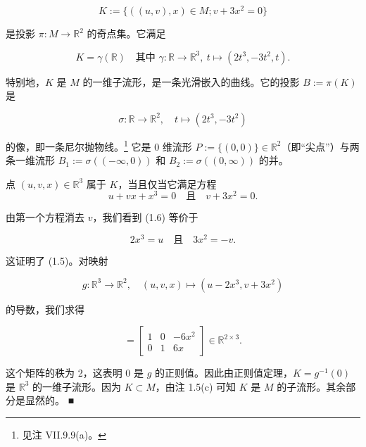 \begin{example}
\begin{items}
\[
K := \{((u, v), x) \in M ; v + 3x^2 = 0\}
\]

是投影 $ \pi: M \to \mathbb{R}^2 $ 的奇点集。它满足

\begin{equation}
K = \gamma(\mathbb{R}) \quad \text{其中 } \gamma: \mathbb{R} \to \mathbb{R}^3, \ t \mapsto (2t^3, -3t^2, t).\tag{1.5}
\end{equation}

特别地，$ K $ 是 $ M $ 的一维子流形，是一条光滑嵌入的曲线。它的投影 $ B := \pi(K) $ 是

\[
\sigma: \mathbb{R} \to \mathbb{R}^2, \quad t \mapsto (2t^3, -3t^2)
\]

的像，即一条尼尔抛物线。\footnote{见注 VII.9.9(a)。} 它是 0 维流形 $ P := \{(0, 0)\} \in \mathbb{R}^2 $（即“尖点”）与两条一维流形 $ B_1 := \sigma((-\infty, 0)) $ 和 $ B_2 := \sigma((0, \infty)) $ 的并。

\end{items}


\proofhead
点 $ (u, v, x) \in \mathbb{R}^3 $ 属于 $ K $，当且仅当它满足方程
\begin{equation}
u + vx + x^3 = 0 \quad \text{且} \quad v + 3x^2 = 0.\tag{1.6}
\end{equation}

由第一个方程消去 $ v $，我们看到 (1.6) 等价于

\[
2x^3 = u \quad \text{且} \quad 3x^2 = -v.
\]

这证明了 (1.5)。对映射

\[
g: \mathbb{R}^3 \to \mathbb{R}^2, \quad (u, v, x) \mapsto (u - 2x^3, v + 3x^2)
\]

的导数，我们求得

\begin{equation*}
[\partial g(u, v, x)] = \begin{bmatrix} 1 & 0 & -6x^2 \\ 0 & 1 & 6x \end{bmatrix} \in \mathbb{R}^{2 \times 3}.
\end{equation*}

这个矩阵的秩为 2，这表明 $ 0 $ 是 $ g $ 的正则值。因此由正则值定理，$ K = g^{-1}(0) $ 是 $ \mathbb{R}^3 $ 的一维子流形。因为 $ K \subset M $，由注 1.5(c) 可知 $ K $ 是 $ M $ 的子流形。其余部分是显然的。 \nobreak\hspace{0.35em}■

\end{example}

